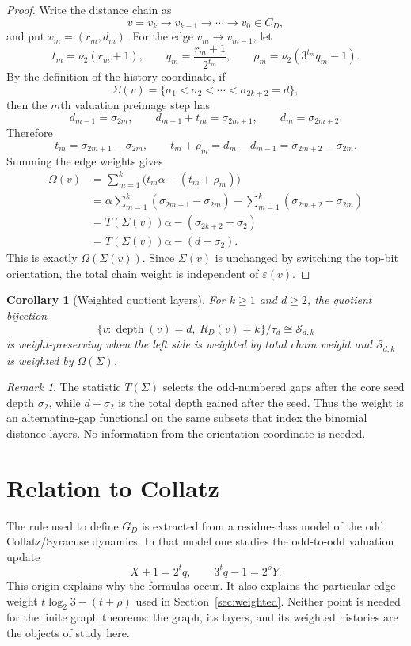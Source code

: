 \documentclass[11pt]{article}
\newtheorem{corollary}[theorem]{Corollary}
\theoremstyle{definition}
\theoremstyle{remark}
\newtheorem{remark}[theorem]{Remark}
\newcommand{\nuu}{\nu_2}
\newcommand{\depth}{\operatorname{depth}}
\newcommand{\Sfam}{\mathcal S}
\newcommand{\eps}{\varepsilon}
\begin{document}
\begin{proof}
Write the distance chain as
\[
v=v_k\to v_{k-1}\to\cdots\to v_0\in C_D,
\]
and put $v_m=(r_m,d_m)$.  For the edge $v_m\to v_{m-1}$, let
\[
t_m=\nuu(r_m+1),\qquad q_m=\frac{r_m+1}{2^{t_m}},\qquad \rho_m=\nuu(3^{t_m}q_m-1).
\]
By the definition of the history coordinate, if
\[
\Sigma(v)=\{\sigma_1<\sigma_2<\cdots<\sigma_{2k+2}=d\},
\]
then the $m$th valuation preimage step has
\[
d_{m-1}=\sigma_{2m},\qquad d_{m-1}+t_m=\sigma_{2m+1},\qquad d_m=\sigma_{2m+2}.
\]
Therefore
\[
t_m=\sigma_{2m+1}-\sigma_{2m},
\qquad
 t_m+\rho_m=d_m-d_{m-1}=\sigma_{2m+2}-\sigma_{2m}.
\]
Summing the edge weights gives
\begin{align*}
\Omega(v)
&=\sum_{m=1}^k\bigl(t_m\alpha-(t_m+\rho_m)\bigr)\\
&=\alpha\sum_{m=1}^k(\sigma_{2m+1}-\sigma_{2m})
  -\sum_{m=1}^k(\sigma_{2m+2}-\sigma_{2m})\\
&=T(\Sigma(v))\alpha-(\sigma_{2k+2}-\sigma_2)\\
&=T(\Sigma(v))\alpha-(d-\sigma_2).
\end{align*}
This is exactly $\Omega(\Sigma(v))$.  Since $\Sigma(v)$ is unchanged by switching the top-bit orientation, the total chain weight is independent of $\eps(v)$.
\end{proof}

\begin{corollary}[Weighted quotient layers]\label{cor:weightedquotient}
For $k\ge1$ and $d\ge2$, the quotient bijection
\[
\{v:\depth(v)=d,\ R_D(v)=k\}/\tau_d\cong\Sfam_{d,k}
\]
is weight-preserving when the left side is weighted by total chain weight and $\Sfam_{d,k}$ is weighted by $\Omega(\Sigma)$.
\end{corollary}

\begin{remark}
The statistic $T(\Sigma)$ selects the odd-numbered gaps after the core seed depth $\sigma_2$, while $d-\sigma_2$ is the total depth gained after the seed.  Thus the weight is an alternating-gap functional on the same subsets that index the binomial distance layers.  No information from the orientation coordinate is needed.
\end{remark}

\section{Relation to Collatz}\label{sec:collatz}

The rule used to define $G_D$ is extracted from a residue-class model of the odd Collatz/Syracuse dynamics.  In that model one studies the odd-to-odd valuation update
\[
X+1=2^tq,
\qquad
3^tq-1=2^\rho Y.
\]
This origin explains why the formulas occur.  It also explains the particular edge weight $t\log_2 3-(t+\rho)$ used in Section~\ref{sec:weighted}.  Neither point is needed for the finite graph theorems: the graph, its layers, and its weighted histories are the objects of study here.
\end{document}
